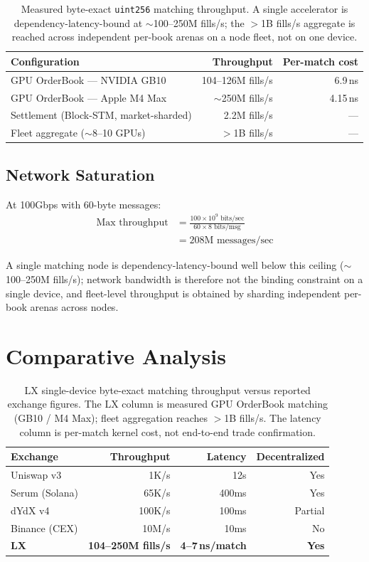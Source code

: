 \documentclass[11pt,a4paper]{article}
\begin{document}
\begin{table}[H]
\centering
\begin{tabular}{lrr}
\toprule
\textbf{Configuration} & \textbf{Throughput} & \textbf{Per-match cost} \\
\midrule
GPU OrderBook --- NVIDIA GB10 & 104--126M fills/s & 6.9\,ns \\
GPU OrderBook --- Apple M4 Max & $\sim$250M fills/s & 4.15\,ns \\
Settlement (Block-STM, market-sharded) & 2.2M fills/s & --- \\
Fleet aggregate ($\sim$8--10 GPUs) & $>$1B fills/s & --- \\
\bottomrule
\end{tabular}
\caption{Measured byte-exact \texttt{uint256} matching throughput. A single
accelerator is dependency-latency-bound at $\sim$100--250M fills/s; the
$>$1B fills/s aggregate is reached across independent per-book arenas on a
node fleet, not on one device.}
\end{table}

\subsection{Network Saturation}

At 100Gbps with 60-byte messages:
\begin{align}
\text{Max throughput} &= \frac{100 \times 10^9 \text{ bits/sec}}{60 \times 8 \text{ bits/msg}} \\
&= 208\text{M messages/sec}
\end{align}

A single matching node is dependency-latency-bound well below this ceiling
($\sim$100--250M fills/s); network bandwidth is therefore not the binding
constraint on a single device, and fleet-level throughput is obtained by
sharding independent per-book arenas across nodes.

\section{Comparative Analysis}

\begin{table}[H]
\centering
\begin{tabular}{lrrr}
\toprule
\textbf{Exchange} & \textbf{Throughput} & \textbf{Latency} & \textbf{Decentralized} \\
\midrule
Uniswap v3 & 1K/s & 12s & Yes \\
Serum (Solana) & 65K/s & 400ms & Yes \\
dYdX v4 & 100K/s & 100ms & Partial \\
Binance (CEX) & 10M/s & 10ms & No \\
\textbf{LX} & \textbf{104--250M fills/s} & \textbf{4--7\,ns/match} & \textbf{Yes} \\
\bottomrule
\end{tabular}
\caption{LX single-device byte-exact matching throughput versus reported
exchange figures. The LX column is measured GPU OrderBook matching (GB10 / M4 Max);
fleet aggregation reaches $>$1B fills/s. The latency column is per-match kernel
cost, not end-to-end trade confirmation.}
\end{table}
\end{document}
